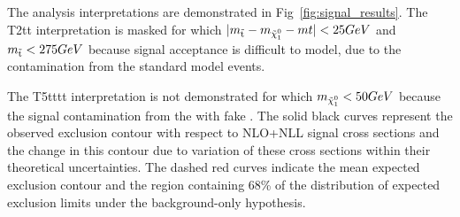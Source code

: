 The analysis interpretations are demonstrated in Fig~\ref{fig:signal_results}. The T2tt interpretation is masked for which $|m_{\tilde{{\mathrm t}}}-m_{\tilde{\chi}^{0}_{1}}-m{t}|<25GeV$ and $m_{\tilde{{\mathrm t}}}<275GeV$ because signal acceptance is difficult to model, due to the contamination from the standard model \ttbar events. 

The T5tttt interpretation is not demonstrated for which $m_{\tilde{\chi}^{0}_{1}}<50GeV$ because the signal contamination from the \ttbar with fake \MET.
The solid black curves represent the observed exclusion contour with respect to NLO+NLL signal cross sections and the change in this contour due to variation of these cross sections within their theoretical uncertainties\cite{Borschensky:2014cia}. The dashed red curves indicate the mean expected exclusion contour and the region containing 68\% of the distribution of expected exclusion limits under the background-only hypothesis. 

